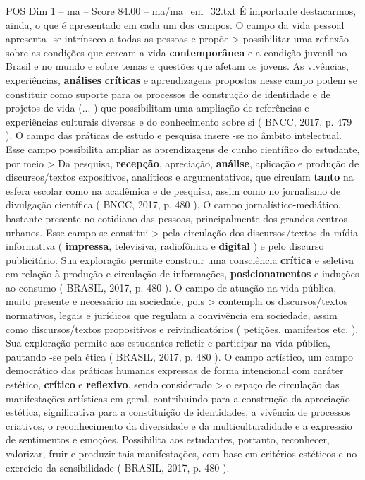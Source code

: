 \begin{textsample}{POS Dim 1 – ma – Score 84.00 – ma/ma\_em\_32.txt}
É importante destacarmos, ainda, o que é apresentado em cada um dos campos.
O campo da vida pessoal apresenta -se intrínseco a todas as pessoas e propõe > possibilitar uma reflexão sobre as condições que cercam a vida \textbf{contemporânea} e a condição juvenil no Brasil e no mundo e sobre temas e questões que afetam os jovens.
As vivências, experiências, \textbf{análises} \textbf{críticas} e aprendizagens propostas nesse campo podem se constituir como suporte para os processos de construção de identidade e de projetos de vida (... ) que possibilitam uma ampliação de referências e experiências culturais diversas e do conhecimento sobre si ( BNCC, 2017, p. 479 ).
O campo das práticas de estudo e pesquisa insere -se no âmbito intelectual.
Esse campo possibilita ampliar as aprendizagens de cunho científico do estudante, por meio > Da pesquisa, \textbf{recepção}, apreciação, \textbf{análise}, aplicação e produção de discursos/textos expositivos, analíticos e argumentativos, que circulam \textbf{tanto} na esfera escolar como na acadêmica e de pesquisa, assim como no jornalismo de divulgação científica ( BNCC, 2017, p. 480 ).
O campo jornalístico-mediático, bastante presente no cotidiano das pessoas, principalmente dos grandes centros urbanos.
Esse campo se constitui > pela circulação dos discursos/textos da mídia informativa ( \textbf{impressa}, televisiva, radiofônica e \textbf{digital} ) e pelo discurso publicitário.
Sua exploração permite construir uma consciência \textbf{crítica} e seletiva em relação à produção e circulação de informações, \textbf{posicionamentos} e induções ao consumo ( BRASIL, 2017, p. 480 ).
O campo de atuação na vida pública, muito presente e necessário na sociedade, pois > contempla os discursos/textos normativos, legais e jurídicos que regulam a convivência em sociedade, assim como discursos/textos propositivos e reivindicatórios ( petições, manifestos etc. ).
Sua exploração permite aos estudantes refletir e participar na vida pública, pautando -se pela ética ( BRASIL, 2017, p. 480 ).
O campo artístico, um campo democrático das práticas humanas expressas de forma intencional com caráter estético, \textbf{crítico} e \textbf{reflexivo}, sendo considerado > o espaço de circulação das manifestações artísticas em geral, contribuindo para a construção da apreciação estética, significativa para a constituição de identidades, a vivência de processos criativos, o reconhecimento da diversidade e da multiculturalidade e a expressão de sentimentos e emoções.
Possibilita aos estudantes, portanto, reconhecer, valorizar, fruir e produzir tais manifestações, com base em critérios estéticos e no exercício da sensibilidade ( BRASIL, 2017, p. 480 ).

\end{textsample}
